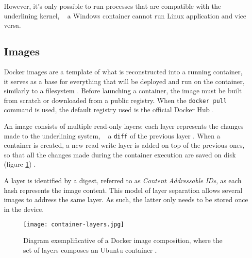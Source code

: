 However, it's only possible to run processes that are compatible with the underlining kernel, \ie~ a Windows container cannot run Linux application and vice versa.

% 


\subsection{Images}
\label{sec::arch:images}
Docker images are a template of what is reconstructed into a running container, it serves as a base for everything that will be deployed and run on the container, similarly to a filesystem \cite{Kane2018-fn}. Before launching a container, the image must be built from scratch or downloaded from a public registry. When the \texttt{docker pull} command is used, the default registry used is the official Docker Hub \cite{docker-hub}.

An image consists of multiple read-only layers; each layer represents the changes made to the underlining system, \ie~ a \texttt{diff} of the previous layer \cite{images-layers}. When a container is created, a new read-write layer is added on top of the previous ones, so that all the changes made during the container execution are saved on disk (figure \ref{fig:docker-image}) \cite{fig-src:image-layers}.

A layer is identified by a digest, referred to as \textit{Content Addressable IDs}, as each hash represents the image content. This model of layer separation allows several images to address the same layer. As such, the latter only needs to be stored once in the device.

\begin{figure}[!htb]
    \centering
    \texttt{[image: container-layers.jpg]}
    \caption{Diagram exemplificative of a Docker image composition, where the set of layers composes an Ubuntu container \cite{fig-src:image-layers}.}
    \label{fig:docker-image}
\end{figure}

